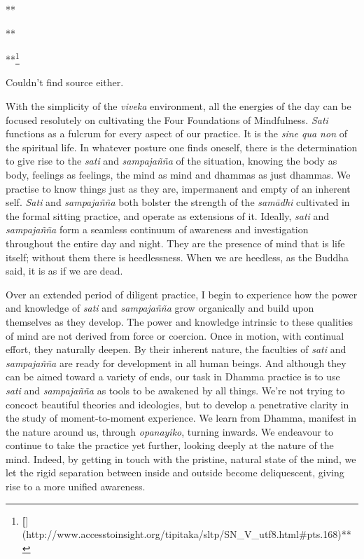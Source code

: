 **

**

**\footnote{\textbf{{[}}{]}(http://www.accesstoinsight.org/tipitaka/sltp/SN\_V\_utf8.html\#pts.168)**}

Couldn't find source either.

With the simplicity of the \emph{viveka} environment, all the energies
of the day can be focused resolutely on cultivating the Four Foundations
of Mindfulness. \emph{Sati} functions as a fulcrum for every aspect of
our practice. It is the \emph{sine qua non} of the spiritual life. In
whatever posture one finds oneself, there is the determination to give
rise to the \emph{sati} and \emph{sampajañña} of the situation, knowing
the body as body, feelings as feelings, the mind as mind and dhammas as
just dhammas. We practise to know things just as they are, impermanent
and empty of an inherent self. \emph{Sati} and \emph{sampajañña} both
bolster the strength of the \emph{samādhi} cultivated in the formal
sitting practice, and operate as extensions of it. Ideally, \emph{sati}
and \emph{sampajañña} form a seamless continuum of awareness and
investigation throughout the entire day and night. They are the presence
of mind that is life itself; without them there is heedlessness. When we
are heedless, as the Buddha said, it is as if we are dead.

Over an extended period of diligent practice, I begin to experience how
the power and knowledge of \emph{sati} and \emph{sampajañña} grow
organically and build upon themselves as they develop. The power and
knowledge intrinsic to these qualities of mind are not derived from
force or coercion. Once in motion, with continual effort, they naturally
deepen. By their inherent nature, the faculties of \emph{sati} and
\emph{sampajañña} are ready for development in all human beings. And
although they can be aimed toward a variety of ends, our task in Dhamma
practice is to use \emph{sati} and \emph{sampajañña} as tools to be
awakened by all things. We're not trying to concoct beautiful theories
and ideologies, but to develop a penetrative clarity in the study of
moment-to-moment experience. We learn from Dhamma, manifest in the
nature around us, through \emph{opanayiko}, turning inwards. We
endeavour to continue to take the practice yet further, looking deeply
at the nature of the mind. Indeed, by getting in touch with the
pristine, natural state of the mind, we let the rigid separation between
inside and outside become deliquescent, giving rise to a more unified
awareness.

